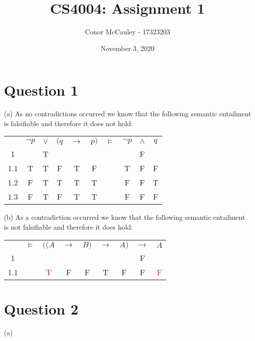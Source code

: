 \documentclass[12pt]{article}
\title{CS4004: Assignment 1}
\author{Conor McCauley - 17323203}
\date{November 3, 2020}
\begin{document}
\maketitle

\section*{Question 1}

\noindent (a) As no contradictions occurred we know that the following semantic entailment is falsifiable and therefore it does not hold:

\begin{center}
    \begin{tabular}{cccccccccc}
        & $\neg p$ & $\vee$ & $(q$ & $\to$ & $p)$ & $\models$ & $\neg p$ & $\wedge$ & $q$ \\
        1   &   & T &   &   &   &   &   & F &   \\
        1.1 & T & T & F & T & F &   & T & F & F \\
        1.2 & F & T & T & T & T &   & F & F & T \\
        1.3 & F & T & F & T & T &   & F & F & F \\
    \end{tabular}
\end{center}

\noindent (b) As a contradiction occurred we know that the following semantic entailment is not falsifiable and therefore it does hold:

\begin{center}
    \begin{tabular}{ccccccccc}
        & $\models$ & $((A$ & $\to$ & $B)$ & $\to$ & $A)$ & $\to$ & $A$ \\
        1   &   &   &   &   &   &   & F &    \\
        1.1 &   & \textcolor{red}{T} & F & F & T & F & F & \textcolor{red}{F}  \\
    \end{tabular}
\end{center}

\section*{Question 2}

\noindent (a)
\end{document}
